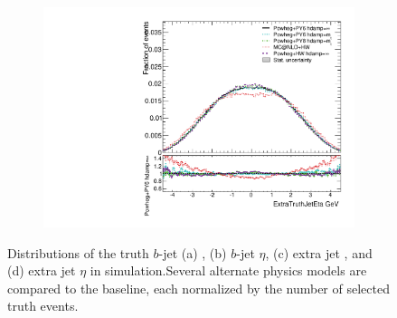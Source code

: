 \begin{figure}
\begin{subfigure}[]{0.45\textwidth}
\end{subfigure}
\begin{subfigure}[]{0.45\textwidth}
\includegraphics[width=\textwidth]{fig/MCComp/NLO/ExtraTruthJetEta.pdf}
\end{subfigure}
\caption{Distributions of the truth $b$-jet (a) \pt, (b) $b$-jet $\eta$, (c) extra jet  \pt, and (d) extra jet $\eta$ in \ttbar simulation.Several alternate physics models are compared to the baseline, each normalized by the number of selected truth events.}
\label{fig:truthbjet}
\end{figure}
